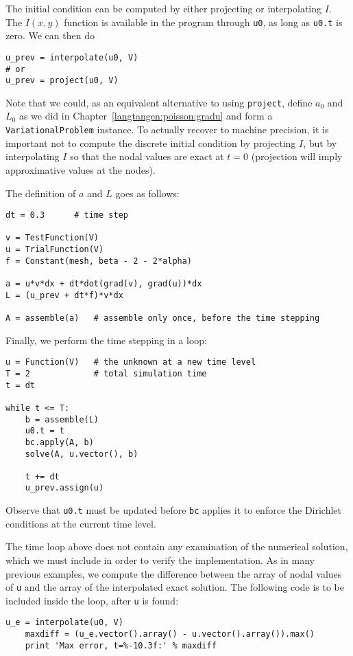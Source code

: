 The initial condition can be computed by either projecting or interpolating
$I$. The $I(x,y)$ function is available in the program through
{\fontsize{12pt}{12pt}\verb!u0!}, 
as long as {\fontsize{12pt}{12pt}\verb!u0.t!} is zero.
We can then do
\begin{Verbatim}[fontsize=\fontsize{10pt}{10pt},tabsize=8,baselinestretch=1.05,
fontfamily=tt,xleftmargin=7mm]
u_prev = interpolate(u0, V)
# or
u_prev = project(u0, V)
\end{Verbatim}
\noindent
Note that we could, as an equivalent alternative to using {\fontsize{12pt}{12pt}\texttt{project}}, define
$a_0$ and $L_0$ as we did in Chapter~\ref{langtangen:poisson:gradu} and form
a {\fontsize{12pt}{12pt}\texttt{VariationalProblem}} instance.
To actually recover  to machine
precision, it is important not to compute the discrete initial condition by
projecting $I$, but by interpolating $I$ so that the nodal values are
exact at $t=0$ (projection will imply approximative values at the nodes).


The definition of $a$ and $L$ goes as follows:
\begin{Verbatim}[fontsize=\fontsize{10pt}{10pt},tabsize=8,baselinestretch=1.05,
fontfamily=tt,xleftmargin=7mm]
dt = 0.3      # time step

v = TestFunction(V)
u = TrialFunction(V)
f = Constant(mesh, beta - 2 - 2*alpha)

a = u*v*dx + dt*dot(grad(v), grad(u))*dx
L = (u_prev + dt*f)*v*dx

A = assemble(a)   # assemble only once, before the time stepping
\end{Verbatim}
\noindent

Finally, we perform the time stepping in a loop:
\begin{Verbatim}[fontsize=\fontsize{10pt}{10pt},tabsize=8,baselinestretch=1.05,
fontfamily=tt,xleftmargin=7mm]
u = Function(V)   # the unknown at a new time level
T = 2             # total simulation time
t = dt

while t <= T:
    b = assemble(L)
    u0.t = t
    bc.apply(A, b)
    solve(A, u.vector(), b)

    t += dt
    u_prev.assign(u)
\end{Verbatim}
\noindent
Observe that {\fontsize{12pt}{12pt}\verb!u0.t!} must be updated before {\fontsize{12pt}{12pt}\texttt{bc}} applies
it to enforce the Dirichlet conditions at the current time level.

The time loop above does not contain any examination of the numerical
solution, which we must include in order to verify the implementation.
As in many previous examples, we compute the difference between
the array of nodal
values of {\fontsize{12pt}{12pt}\texttt{u}} and the array of the interpolated exact solution.
The following code is to be included inside the loop, after {\fontsize{12pt}{12pt}\texttt{u}}
is found:
\begin{Verbatim}[fontsize=\fontsize{10pt}{10pt},tabsize=8,baselinestretch=1.05,
fontfamily=tt,xleftmargin=7mm]
    u_e = interpolate(u0, V)
    maxdiff = (u_e.vector().array() - u.vector().array()).max()
    print 'Max error, t=%-10.3f:' % maxdiff
\end{Verbatim}
\noindent


